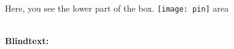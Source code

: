 \documentclass[a4paper]{chirri} %
\newcommand*{\localLocPin}{%
  \texttt{[image: pin]}%
}
\begin{document}
\layout                    %

\begin{headingbox}[skin=bicolor,colbacklower=yellow,lower separated=true]
\lipsum[1]
\tcblower
Here, you see the lower part of the box.
   {\Large{\localLocPin}}{} area
\end{headingbox}
\\[2\baselineskip]

\lipsum[1-3]
\textbf{Blindtext:}
\Blindtext
\end{document}
